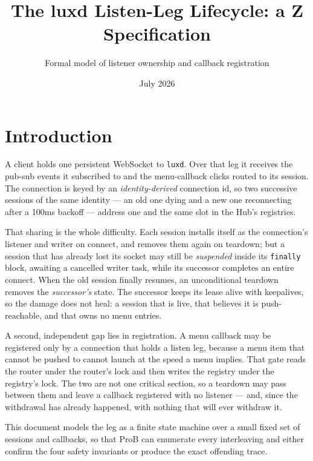 \documentclass[a4paper,10pt,fleqn]{article}
\begin{document}
\title{The luxd Listen-Leg Lifecycle: a Z Specification}
\author{Formal model of listener ownership and callback registration}
\date{July 2026}
\maketitle

\section{Introduction}

A client holds one persistent WebSocket to \texttt{luxd}.  Over that leg
it receives the pub-sub events it subscribed to and the menu-callback
clicks routed to its session.  The connection is keyed by an
\emph{identity-derived} connection id, so two successive sessions of the
same identity --- an old one dying and a new one reconnecting after a
100ms backoff --- address one and the same slot in the Hub's registries.

That sharing is the whole difficulty.  Each session installs itself as
the connection's listener and writer on connect, and removes them again
on teardown; but a session that has already lost its socket may still be
\emph{suspended} inside its \texttt{finally} block, awaiting a cancelled
writer task, while its successor completes an entire connect.  When the
old session finally resumes, an unconditional teardown removes the
\emph{successor's} state.  The successor keeps its lease alive with
keepalives, so the damage does not heal: a session that is live, that
believes it is push-reachable, and that owns no menu entries.

A second, independent gap lies in registration.  A menu callback may be
registered only by a connection that holds a listen leg, because a menu
item that cannot be pushed to cannot launch at the speed a menu implies.
That gate reads the router under the router's lock and then writes the
registry under the registry's lock.  The two are not one critical
section, so a teardown may pass between them and leave a callback
registered with no listener --- and, since the withdrawal has already
happened, with nothing that will ever withdraw it.

This document models the leg as a finite state machine over a small
fixed set of sessions and callbacks, so that ProB can enumerate every
interleaving and either confirm the four safety invariants or produce
the exact offending trace.
\end{document}
